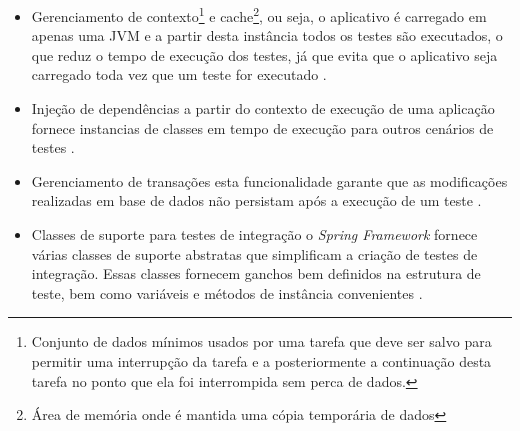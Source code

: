 \begin{itemize}
    \item Gerenciamento de contexto\footnote{Conjunto de dados mínimos usados por uma tarefa que deve ser salvo para permitir uma interrupção da tarefa e a posteriormente a continuação desta tarefa no ponto que ela foi interrompida sem perca de dados.} e cache\footnote{Área de memória onde é mantida uma cópia temporária de dados}, ou seja, o aplicativo é carregado em apenas uma JVM e a partir desta instância todos os testes são executados, o que reduz o tempo de execução dos testes, já que evita que o aplicativo seja carregado toda vez que um teste for executado  \cite{spring}. 


\item Injeção de dependências a partir do contexto de execução de uma aplicação fornece instancias de classes em tempo de execução para outros cenários de testes  \cite{spring}. 


\item Gerenciamento de transações esta funcionalidade garante que as modificações realizadas em base de dados não persistam após a execução de um teste  \cite{spring}. 



\item Classes de suporte para testes de integração o \textit{Spring Framework} fornece várias classes de suporte abstratas que simplificam a criação de testes de integração. Essas classes fornecem ganchos bem definidos na estrutura de teste, bem como variáveis e métodos de instância convenientes  \cite{spring}.

\end{itemize}





